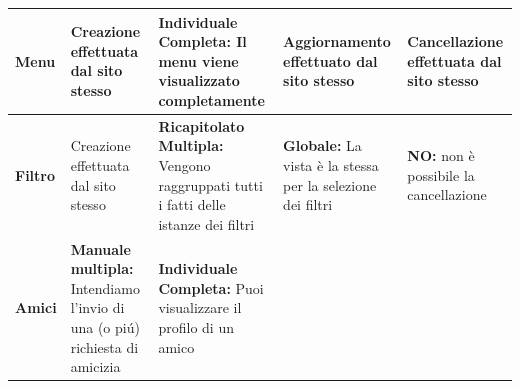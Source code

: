 \documentclass[../Report.tex]{subfiles}
\begin{document}
    \begin{table}[H]
        \hspace{-2.5cm}
        \begin{tabular}{|p{2.5cm}|p{3.5cm}|p{3.5cm}|p{3.5cm}|p{3.5cm}|}
            \hline
            \textbf{Menu} & \cellcolor{red} Creazione effettuata dal sito stesso & \cellcolor{green} \textbf{Individuale Completa:} Il menu viene visualizzato completamente & \cellcolor{red} Aggiornamento effettuato dal sito stesso & \cellcolor{red} Cancellazione effettuata dal sito stesso \\
            \hline
            \textbf{Filtro} & \cellcolor{red} Creazione effettuata dal sito stesso & \cellcolor{green} \textbf{Ricapitolato Multipla:} Vengono raggruppati tutti i fatti delle istanze dei filtri  & \cellcolor{green} \textbf{Globale:} La vista è la stessa per la selezione dei filtri & \cellcolor{red} \textbf{NO:} non è possibile la cancellazione \\
            \hline
            \textbf{Amici} & \cellcolor{gray} \textbf{Manuale multipla:} Intendiamo l’invio di una (o piú) richiesta di amicizia & \cellcolor{gray} \textbf{Individuale Completa:} Puoi visualizzare il profilo di un amico


\end{tabular}
\end{table}
\end{document}
